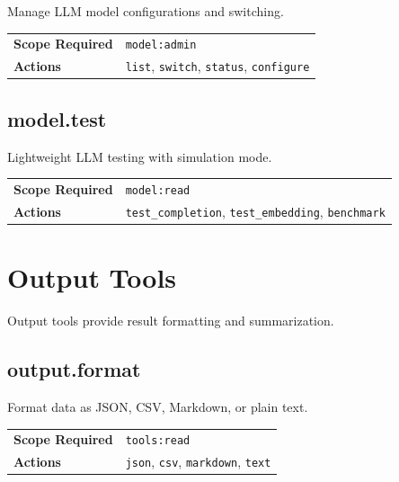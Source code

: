 Manage LLM model configurations and switching.

\begin{table}[ht]
\centering
\small
\begin{tabularx}{\textwidth}{lX}
    \hline
    \textbf{Scope Required} & \texttt{model:admin} \\
    \textbf{Actions} & \texttt{list}, \texttt{switch}, \texttt{status}, \texttt{configure} \\
    \hline
\end{tabularx}
\end{table}

\subsection{model.test}

Lightweight LLM testing with simulation mode.

\begin{table}[ht]
\centering
\small
\begin{tabularx}{\textwidth}{lX}
    \hline
    \textbf{Scope Required} & \texttt{model:read} \\
    \textbf{Actions} & \texttt{test\_completion}, \texttt{test\_embedding}, \texttt{benchmark} \\
    \hline
\end{tabularx}
\end{table}

\section{Output Tools}
\label{app:tools:output}

Output tools provide result formatting and summarization.

\subsection{output.format}

Format data as JSON, CSV, Markdown, or plain text.

\begin{table}[ht]
\centering
\small
\begin{tabularx}{\textwidth}{lX}
    \hline
    \textbf{Scope Required} & \texttt{tools:read} \\
    \textbf{Actions} & \texttt{json}, \texttt{csv}, \texttt{markdown}, \texttt{text} \\
    \hline
\end{tabularx}
\end{table}

